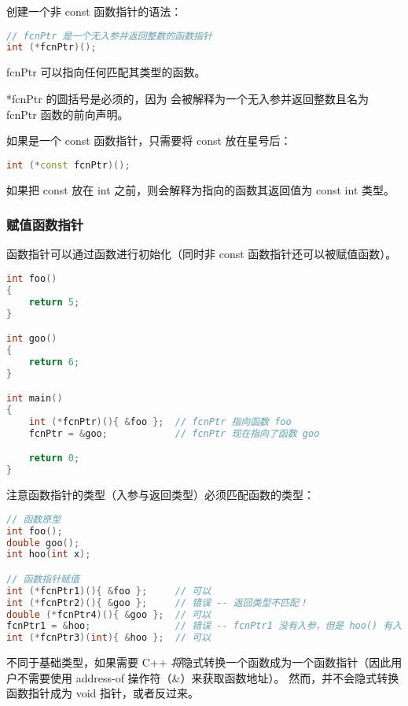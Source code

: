 \documentclass[../../LearnCpp.tex]{subfiles}
\begin{document}

创建一个非 const 函数指针的语法：

\begin{lstlisting}[language=C++]
// fcnPtr 是一个无入参并返回整数的函数指针
int (*fcnPtr)();
\end{lstlisting}

fcnPtr 可以指向任何匹配其类型的函数。

*fcnPtr 的圆括号是必须的，因为 
会被解释为一个无入参并返回整数且名为 fcnPtr 函数的前向声明。

如果是一个 const 函数指针，只需要将 const 放在星号后：

\begin{lstlisting}[language=C++]
int (*const fcnPtr)();
\end{lstlisting}

如果把 const 放在 int 之前，则会解释为指向的函数其返回值为 const int 类型。

\subsubsection*{赋值函数指针}

函数指针可以通过函数进行初始化（同时非 const 函数指针还可以被赋值函数）。

\begin{lstlisting}[language=C++]
int foo()
{
    return 5;
}

int goo()
{
    return 6;
}

int main()
{
    int (*fcnPtr)(){ &foo };  // fcnPtr 指向函数 foo
    fcnPtr = &goo;            // fcnPtr 现在指向了函数 goo

    return 0;
}
\end{lstlisting}

注意函数指针的类型（入参与返回类型）必须匹配函数的类型：

\begin{lstlisting}[language=C++]
// 函数原型
int foo();
double goo();
int hoo(int x);

// 函数指针赋值
int (*fcnPtr1)(){ &foo };     // 可以
int (*fcnPtr2)(){ &goo };     // 错误 -- 返回类型不匹配！
double (*fcnPtr4)(){ &goo };  // 可以
fcnPtr1 = &hoo;               // 错误 -- fcnPtr1 没有入参，但是 hoo() 有入参
int (*fcnPtr3)(int){ &hoo };  // 可以
\end{lstlisting}

不同于基础类型，如果需要 C++ \textit{将}隐式转换一个函数成为一个函数指针（因此用户不需要使用 address-of 操作符（\&）来获取函数地址）。
然而，并不会隐式转换函数指针成为 void 指针，或者反过来。
\end{document}
